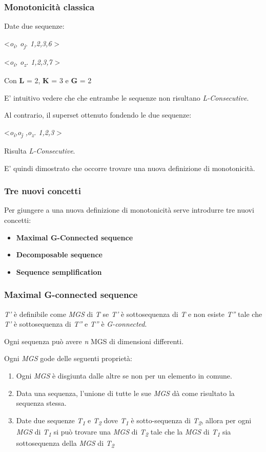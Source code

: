 \documentclass{beamer}
\begin{document}
\begin{frame}
	\frametitle{Monotonicità classica}
Date due sequenze: 

	\textless \textit{o\textsubscript{i}, o\textsubscript{j}. 1,2,3,6} \textgreater
	
		\textless \textit{o\textsubscript{i}, o\textsubscript{z}. 1,2,3,7} \textgreater
		
		Con \textbf{L} = 2, \textbf{K} = 3 e \textbf{G} = 2
		
		E' intuitivo vedere che che entrambe le sequenze non risultano  \textit{L-Consecutive}.
		
		Al contrario, il superset ottenuto fondendo le due sequenze:
		
		\textless \textit{o\textsubscript{i},o\textsubscript{j}  ,o\textsubscript{z}. 1,2,3} \textgreater
		
		
		Risulta \textit{L-Consecutive}.
		
		E' quindi dimostrato che occorre trovare una nuova definizione di monotonicità.
		
\end{frame}

\begin{frame}
	\frametitle{Tre nuovi concetti}
	Per giungere a una nuova definizione di monotonicità serve introdurre tre nuovi concetti:
	
	\begin{itemize}
		\item \textbf{Maximal G-Connected sequence}
		\item \textbf{Decomposable sequence}
		\item \textbf{Sequence semplification}
	\end{itemize}
\end{frame}

\begin{frame}
	
	\frametitle{Maximal G-connected sequence}
	\textit{T'} è definibile come 
	\textit{MGS} di \textit{T} se \textit{T'} è sottosequenza di \textit{T} e non esiste \textit{T''} tale che \textit{T'} è sottosequenza di \textit{T''} e \textit{T''} è \textit{G-connected}.
	
	Ogni sequenza può avere \textit{n} MGS di dimensioni differenti.
	
	Ogni \textit{MGS} gode delle seguenti proprietà: 
	\begin{enumerate}
		\item Ogni \textit{MGS} è disgiunta dalle altre se non per un elemento in comune.
		\item Data una sequenza, l'unione di tutte le sue \textit{MGS} dà come risultato la sequenza stessa.
		\item Date due sequenze \textit{T\textsubscript{1}} e \textit{T\textsubscript{2}} dove
		\textit{T\textsubscript{1}} è sotto-sequenza di \textit{T\textsubscript{2}}, allora per ogni \textit{MGS} di \textit{T\textsubscript{1}} si può trovare una \textit{MGS} di 
		\textit{T\textsubscript{2}} tale che la \textit{MGS} di \textit{T\textsubscript{1}} sia sottosequenza della \textit{MGS} di \textit{T\textsubscript{2}}     
	\end{enumerate}
	
	\end{frame}
\end{document}
